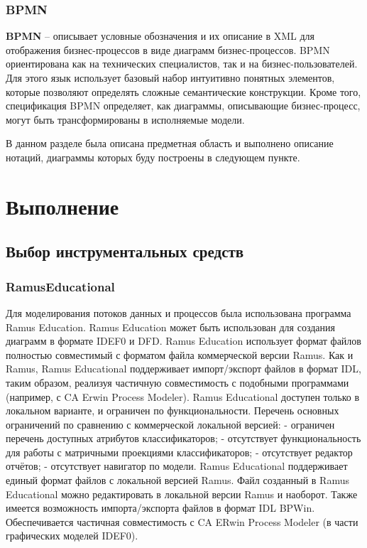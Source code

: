 \documentclass[a4paper,14pt]{extarticle}
\begin{document}
\subsubsection{BPMN}
\textbf{BPMN} – описывает условные обозначения и их описание в XML для отображения
бизнес-процессов в виде диаграмм бизнес-процессов. BPMN ориентирована как на
технических специалистов, так и на бизнес-пользователей. Для этого язык
использует базовый набор интуитивно понятных элементов, которые позволяют
определять сложные семантические конструкции. Кроме того, спецификация BPMN
определяет, как диаграммы, описывающие бизнес-процесс, могут быть
трансформированы в исполняемые модели.

В данном разделе была описана предметная область и выполнено описание нотаций,
диаграммы которых буду построены в следующем пункте.

\section{Выполнение}
\subsection{Выбор инструментальных средств}
\subsubsection{RamusEducational}
Для моделирования потоков данных и процессов была использована программа Ramus
Education. Ramus Education может быть использован для создания диаграмм в
формате IDEF0 и DFD. Ramus Education использует формат файлов полностью
совместимый с форматом файла коммерческой версии Ramus. Как и Ramus, Ramus
Educational поддерживает импорт/экспорт файлов в формат IDL, таким образом,
реализуя частичную совместимость с подобными программами (например, с CA Erwin
Process Modeler). Ramus Educational доступен только в локальном варианте, и
ограничен по функциональности. Перечень основных ограничений по сравнению с
коммерческой локальной версией: - ограничен перечень доступных атрибутов
классификаторов; - отсутствует функциональность для работы с матричными
проекциями классификаторов; - отсутствует редактор отчётов; - отсутствует
навигатор по модели. Ramus Educational поддерживает единый формат файлов с
локальной версией Ramus. Файл созданный в Ramus Educational можно редактировать
в локальной версии Ramus и наоборот. Также имеется возможность импорта/экспорта
файлов в формат IDL BPWin. Обеспечивается частичная совместимость с CA ERwin
Process Modeler (в части графических моделей IDEF0).
\end{document}
